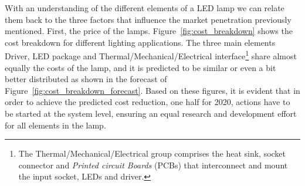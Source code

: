 With an understanding of the different elements of a LED lamp we can relate them back to the three factors that influence the market penetration previously mentioned. First, the price of the lamps. Figure~\ref{fig:cost_breakdown} shows the cost breakdown for different lighting applications. The three main elements Driver, LED package and Thermal/Mechanical/Electrical interface\footnote{The Thermal/Mechanical/Electrical group comprises the heat sink, socket connector and \emph{Printed circuit Boards} (PCBs) that interconnect and mount the input socket, LEDs and driver.} share  almost equally the costs of the lamp, and it is predicted to be similar or even a bit better distributed as shown in the forecast of Figure~\ref{fig:cost_breakdown_forecast}. Based on these figures, it is evident that in order to achieve the predicted cost reduction, one half for 2020, actions have to be started at the system level, ensuring an equal research and development effort for all elements in the lamp.

